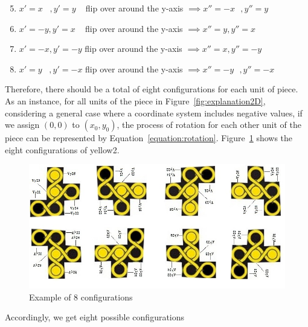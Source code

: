 \begin{enumerate}
\setcounter{enumi}{4}
  \item  $x'=x\hspace{10pt}, y'=y\hspace{10pt}$    flip over around the y-axis $\implies x''=-x\hspace{8pt},y''=y$
  \item  $x'=-y, y'=x\hspace{10pt}$                flip over around the y-axis $\implies x''=y,y''=x$
  \item  $x'=-x, y'=-y$               flip over around the y-axis $\implies x''=x, y''=-y$
  \item  $x'=y\hspace{10pt},y'=-x$    flip over around the y-axis $\implies x''=-y\hspace{8pt}, y''=-x$
  \label{mirrorrotate4}
\end{enumerate}
Therefore, there should be a total of eight configurations for each unit of piece.
As an instance, for all units of the piece in Figure~\ref{fig:explanation2D}, considering a general case where a coordinate system includes negative values, if we assign $(0,0)$ to $(x_{0},y_{0})$, the process of rotation for each other unit of the piece can be represented by Equation~\ref{equation:rotation}. Figure~\ref{fig:Exampleof8} shows the eight configurations of yellow2.
\begin{figure}[htbp]
\centering
\includegraphics[width =\textwidth]{figs/domainexplain.jpg}
    \caption{Example of 8 configurations}
    \label{fig:Exampleof8}
\end{figure}
Accordingly, we get eight possible configurations

